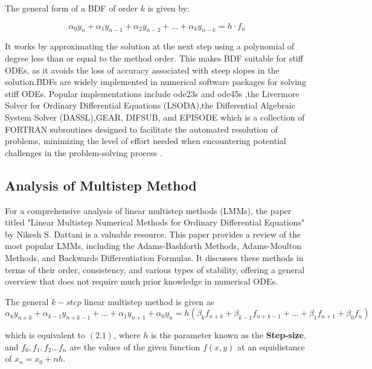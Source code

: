 The general form of a BDF of order \(k\) is given by:

\begin{equation}
  \alpha_0 y_n + \alpha_1 y_{n-1} + \alpha_2 y_{n-2} + \ldots + \alpha_k y_{n-k} = h \cdot f_n
\end{equation}


It works by approximating the solution at the next step using a polynomial of degree less than or equal to the method order. This makes BDF suitable for stiff ODEs, as it avoids the loss of accuracy associated with steep slopes in the solution.BDFs are widely implemented in numerical software packages for solving stiff ODEs. Popular implementations include ode23s and ode45s \cite{shampine1997matlab},the Livermore Solver for Ordinary Differential Equations (LSODA),the Differential Algebraic System Solver (DASSL),GEAR, DIFSUB, and EPISODE \cite{Yatim2013} which is a collection of FORTRAN subroutines designed to facilitate the automated resolution of problems, minimizing the level of effort needed when encountering potential challenges in the problem-solving process \cite{thohura2013numerical}.


\subsection{Analysis of Multistep Method}

For a comprehensive analysis of linear multistep methods (LMMs), the paper titled "Linear Multistep Numerical Methods for Ordinary Differential Equations" by Nikesh S. Dattani is a valuable resource. This paper provides a review of the most popular LMMs, including the Adams-Bashforth Methods, Adams-Moulton Methods, and Backwards Differentiation Formulas. It discusses these methods in terms of their order, consistency, and various types of stability, offering a general overview that does not require much prior knowledge in numerical ODEs\cite{dattani2008linear}.

The general $k-step$ linear multistep method is given as 
\begin{equation}
  \alpha_k y_{n+k} + \alpha_{k-1} y_{n+k-1} + \ldots + \alpha_1 y_{n+1} + \alpha_0 y_n = h \left( \beta_k f_{n+k} + \beta_{k-1} f_{n+k-1} + \ldots + \beta_1 f_{n+1} + \beta_0 f_n \right)
\end{equation}

 which is equivalent to $(2.1)$, where $h$ is the parameter known as the \textbf{Step-size}, and $f_0, f_1, f_2 ... f_n$ are the values of the given function $f(x,y)$ at an equidistance of  $x_n = x_0 + nh$.

